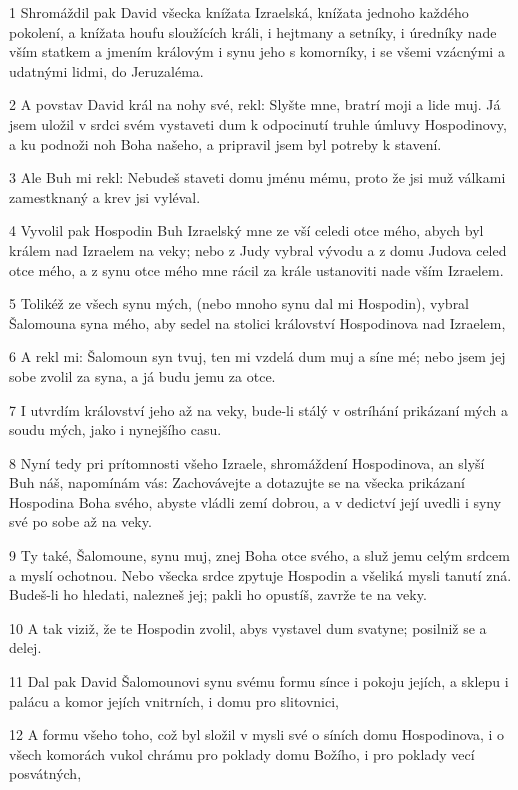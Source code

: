 \par 1 Shromáždil pak David všecka knížata Izraelská, knížata jednoho každého pokolení, a knížata houfu sloužících králi, i hejtmany a setníky, i úredníky nade vším statkem a jmením královým i synu jeho s komorníky, i se všemi vzácnými a udatnými lidmi, do Jeruzaléma.
\par 2 A povstav David král na nohy své, rekl: Slyšte mne, bratrí moji a lide muj. Já jsem uložil v srdci svém vystaveti dum k odpocinutí truhle úmluvy Hospodinovy, a ku podnoži noh Boha našeho, a pripravil jsem byl potreby k stavení.
\par 3 Ale Buh mi rekl: Nebudeš staveti domu jménu mému, proto že jsi muž válkami zamestknaný a krev jsi vyléval.
\par 4 Vyvolil pak Hospodin Buh Izraelský mne ze vší celedi otce mého, abych byl králem nad Izraelem na veky; nebo z Judy vybral vývodu a z domu Judova celed otce mého, a z synu otce mého mne rácil za krále ustanoviti nade vším Izraelem.
\par 5 Tolikéž ze všech synu mých, (nebo mnoho synu dal mi Hospodin), vybral Šalomouna syna mého, aby sedel na stolici království Hospodinova nad Izraelem,
\par 6 A rekl mi: Šalomoun syn tvuj, ten mi vzdelá dum muj a síne mé; nebo jsem jej sobe zvolil za syna, a já budu jemu za otce.
\par 7 I utvrdím království jeho až na veky, bude-li stálý v ostríhání prikázaní mých a soudu mých, jako i nynejšího casu.
\par 8 Nyní tedy pri prítomnosti všeho Izraele, shromáždení Hospodinova, an slyší Buh náš, napomínám vás: Zachovávejte a dotazujte se na všecka prikázaní Hospodina Boha svého, abyste vládli zemí dobrou, a v dedictví její uvedli i syny své po sobe až na veky.
\par 9 Ty také, Šalomoune, synu muj, znej Boha otce svého, a služ jemu celým srdcem a myslí ochotnou. Nebo všecka srdce zpytuje Hospodin a všeliká mysli tanutí zná. Budeš-li ho hledati, nalezneš jej; pakli ho opustíš, zavrže te na veky.
\par 10 A tak viziž, že te Hospodin zvolil, abys vystavel dum svatyne; posilniž se a delej.
\par 11 Dal pak David Šalomounovi synu svému formu sínce i pokoju jejích, a sklepu i palácu a komor jejích vnitrních, i domu pro slitovnici,
\par 12 A formu všeho toho, což byl složil v mysli své o síních domu Hospodinova, i o všech komorách vukol chrámu pro poklady domu Božího, i pro poklady vecí posvátných,
